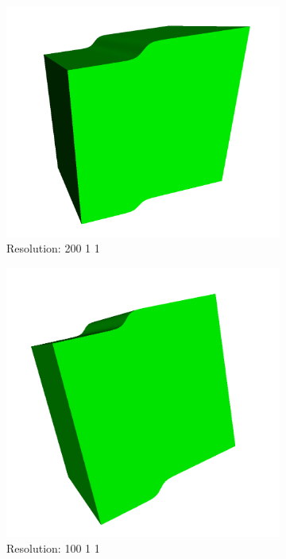 \documentclass[acmlarge,nonacm=true]{acmart}
\begin{document}
\begin{figure}[H]
	\begin{subfigure}{.33\textwidth}
	  \centering
	  \includegraphics[width=.8\linewidth]{fig/2_200_1_1}
	  \caption{Resolution: 200 1 1}
	\end{subfigure}%
	\begin{subfigure}{.33\textwidth}
	  \centering
	  \includegraphics[width=.8\linewidth]{fig/2_100_1_1}
	  \caption{Resolution: 100 1 1}
	\end{subfigure}
	\begin{subfigure}{.33\textwidth}
		\centering

\end{subfigure}
\end{figure}
\end{document}
